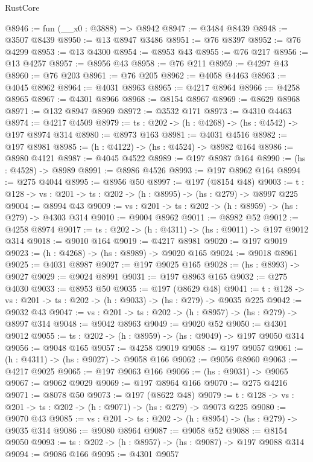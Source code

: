 \begin{lexlean}{RustCore}
\begin{coremodule}
@8946 := fun (__x0 : @3888) => @8942
@8947 := @3484 @8439
@8948 := @3507 @8439
@8950 := @13 @8947 @3486
@8951 := @76 @8397
@8952 := @76 @4299
@8953 := @13 @4300
@8954 := @8953 @43
@8955 := @76 @217
@8956 := @13 @4257
@8957 := @8956 @43
@8958 := @76 @211
@8959 := @4297 @43
@8960 := @76 @203
@8961 := @76 @205
@8962 := @4058 @4463
@8963 := @4045 @8962
@8964 := @4031 @8963
@8965 := @4217 @8964
@8966 := @4258 @8965
@8967 := @4301 @8966
@8968 := @8154 @8967
@8969 := @8629 @8968
@8971 := @132 @8947 @8969
@8972 := @3532 @171
@8973 := @4310 @4463
@8974 := @4217 @4509
@8979 := {ts : @202} -> (h : @4268) -> (hs : @4542) -> @197 @8974 @314
@8980 := @8973 @163
@8981 := @4031 @4516
@8982 := @197 @8981
@8985 := (h : @4122) -> (hs : @4524) -> @8982 @164
@8986 := @8980 @4121
@8987 := @4045 @4522
@8989 := @197 @8987 @164
@8990 := (hs : @4528) -> @8989
@8991 := @8986 @4526
@8993 := @197 @8962 @164
@8994 := @275 @4044
@8995 := @8956 @50
@8997 := @197 (@8154 @48)
@9003 := {t : @128} -> {vs : @201} -> {ts : @202} -> (h : @8995) -> (hs : @279) -> @8997 @225
@9004 := @8994 @43
@9009 := {vs : @201} -> {ts : @202} -> (h : @8959) -> (hs : @279) -> @4303 @314
@9010 := @9004 @8962
@9011 := @8982 @52
@9012 := @4258 @8974
@9017 := {ts : @202} -> (h : @4311) -> (hs : @9011) -> @197 @9012 @314
@9018 := @9010 @164
@9019 := @4217 @8981
@9020 := @197 @9019
@9023 := (h : @4268) -> (hs : @8989) -> @9020 @165
@9024 := @9018 @8961
@9025 := @4031 @8987
@9027 := @197 @9025 @165
@9028 := (hs : @8993) -> @9027
@9029 := @9024 @8991
@9031 := @197 @8963 @165
@9032 := @275 @4030
@9033 := @8953 @50
@9035 := @197 (@8629 @48)
@9041 := {t : @128} -> {vs : @201} -> {ts : @202} -> (h : @9033) -> (hs : @279) -> @9035 @225
@9042 := @9032 @43
@9047 := {vs : @201} -> {ts : @202} -> (h : @8957) -> (hs : @279) -> @8997 @314
@9048 := @9042 @8963
@9049 := @9020 @52
@9050 := @4301 @9012
@9055 := {ts : @202} -> (h : @8959) -> (hs : @9049) -> @197 @9050 @314
@9056 := @9048 @165
@9057 := @4258 @9019
@9058 := @197 @9057
@9061 := (h : @4311) -> (hs : @9027) -> @9058 @166
@9062 := @9056 @8960
@9063 := @4217 @9025
@9065 := @197 @9063 @166
@9066 := (hs : @9031) -> @9065
@9067 := @9062 @9029
@9069 := @197 @8964 @166
@9070 := @275 @4216
@9071 := @8078 @50
@9073 := @197 (@8622 @48)
@9079 := {t : @128} -> {vs : @201} -> {ts : @202} -> (h : @9071) -> (hs : @279) -> @9073 @225
@9080 := @9070 @43
@9085 := {vs : @201} -> {ts : @202} -> (h : @8954) -> (hs : @279) -> @9035 @314
@9086 := @9080 @8964
@9087 := @9058 @52
@9088 := @8154 @9050
@9093 := {ts : @202} -> (h : @8957) -> (hs : @9087) -> @197 @9088 @314
@9094 := @9086 @166
@9095 := @4301 @9057

\end{coremodule}
\end{lexlean}
